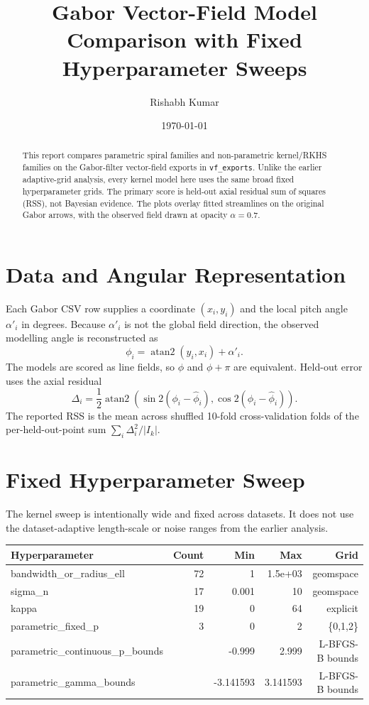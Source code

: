 \documentclass[10pt]{article}
\title{Gabor Vector-Field Model Comparison with Fixed Hyperparameter Sweeps}
\author{Rishabh Kumar}
\date{\today}
\begin{document}
\maketitle

\begin{abstract}
This report compares parametric spiral families and non-parametric kernel/RKHS families on the Gabor-filter vector-field exports in \texttt{vf\_exports}.  Unlike the earlier adaptive-grid analysis, every kernel model here uses the same broad fixed hyperparameter grids.  The primary score is held-out axial residual sum of squares (RSS), not Bayesian evidence.  The plots overlay fitted streamlines on the original Gabor arrows, with the observed field drawn at opacity $\alpha=0.7$.
\end{abstract}

\section{Data and Angular Representation}
Each Gabor CSV row supplies a coordinate $(x_i,y_i)$ and the local pitch angle $\alpha'_i$ in degrees.  Because $\alpha'_i$ is not the global field direction, the observed modelling angle is reconstructed as
\[
  \phi_i=\operatorname{atan2}(y_i,x_i)+\alpha'_i.
\]
The models are scored as line fields, so $\phi$ and $\phi+\pi$ are equivalent.  Held-out error uses the axial residual
\[
  \Delta_i=\frac12\operatorname{atan2}\left(\sin 2(\phi_i-\hat\phi_i),\cos 2(\phi_i-\hat\phi_i)\right).
\]
The reported RSS is the mean across shuffled 10-fold cross-validation folds of the per-held-out-point sum $\sum_i\Delta_i^2/|I_k|$.

\section{Fixed Hyperparameter Sweep}
The kernel sweep is intentionally wide and fixed across datasets.  It does not use the dataset-adaptive length-scale or noise ranges from the earlier analysis.

\begin{center}
\begin{tabular}{lrrrr}
\toprule
Hyperparameter & Count & Min & Max & Grid \\
\midrule
bandwidth\_or\_radius\_ell & 72 & 1 & 1.5e+03 & geomspace \\
sigma\_n & 17 & 0.001 & 10 & geomspace \\
kappa & 19 & 0 & 64 & explicit \\
parametric\_fixed\_p & 3 & 0 & 2 & \{0,1,2\} \\
parametric\_continuous\_p\_bounds &  & -0.999 & 2.999 & L-BFGS-B bounds \\
parametric\_gamma\_bounds &  & -3.141593 & 3.141593 & L-BFGS-B bounds \\
\bottomrule
\end{tabular}
\end{center}
\end{document}

